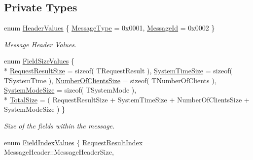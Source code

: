 \subsection*{Private Types}
\begin{DoxyCompactItemize}
\item 
enum \hyperlink{class_terra_swarm_1_1_asynchronous_1_1_client_connection_response_a210030e9835d5daaae100ff496cc2b99}{Header\-Values} \{ \hyperlink{class_terra_swarm_1_1_asynchronous_1_1_client_connection_response_a210030e9835d5daaae100ff496cc2b99a1b0238ecfc24737ee8aa6565198b4052}{Message\-Type} = 0x0001, 
\hyperlink{class_terra_swarm_1_1_asynchronous_1_1_client_connection_response_a210030e9835d5daaae100ff496cc2b99ad712a2b73f3d9eff7aafa56e30b11bad}{Message\-Id} = 0x0002
 \}
\begin{DoxyCompactList}\small\item\em Message Header Values. \end{DoxyCompactList}\item 
enum \hyperlink{class_terra_swarm_1_1_asynchronous_1_1_client_connection_response_a059519ab548bdfbe546b4583c5174fe1}{Field\-Size\-Values} \{ \\*
\hyperlink{class_terra_swarm_1_1_asynchronous_1_1_client_connection_response_a059519ab548bdfbe546b4583c5174fe1ad21e0ac9ec91fa55bf9ba9f4881872cf}{Request\-Result\-Size} = sizeof( T\-Request\-Result ), 
\hyperlink{class_terra_swarm_1_1_asynchronous_1_1_client_connection_response_a059519ab548bdfbe546b4583c5174fe1aebe21ab3228fd3367b5372237080e6af}{System\-Time\-Size} = sizeof( T\-System\-Time ), 
\hyperlink{class_terra_swarm_1_1_asynchronous_1_1_client_connection_response_a059519ab548bdfbe546b4583c5174fe1a2723f340b52e7a61e4ed178a70f167df}{Number\-Of\-Clients\-Size} = sizeof( T\-Number\-Of\-Clients ), 
\hyperlink{class_terra_swarm_1_1_asynchronous_1_1_client_connection_response_a059519ab548bdfbe546b4583c5174fe1a837dd622de291c559f0cdd336d8c4644}{System\-Mode\-Size} = sizeof( T\-System\-Mode ), 
\\*
\hyperlink{class_terra_swarm_1_1_asynchronous_1_1_client_connection_response_a059519ab548bdfbe546b4583c5174fe1a8e2d828f094f9ecb69a26c1eed16a103}{Total\-Size} = ( Request\-Result\-Size + System\-Time\-Size + Number\-Of\-Clients\-Size + System\-Mode\-Size )
 \}
\begin{DoxyCompactList}\small\item\em Size of the fields within the message. \end{DoxyCompactList}\item 
enum \hyperlink{class_terra_swarm_1_1_asynchronous_1_1_client_connection_response_a696e860584893543721be9624b7114fc}{Field\-Index\-Values} \{ \hyperlink{class_terra_swarm_1_1_asynchronous_1_1_client_connection_response_a696e860584893543721be9624b7114fca29bcb52c78bd4915167362f6f59ce536}{Request\-Result\-Index} = Message\-Header\-:\-:Message\-Header\-Size, 

\end{DoxyCompactItemize}
